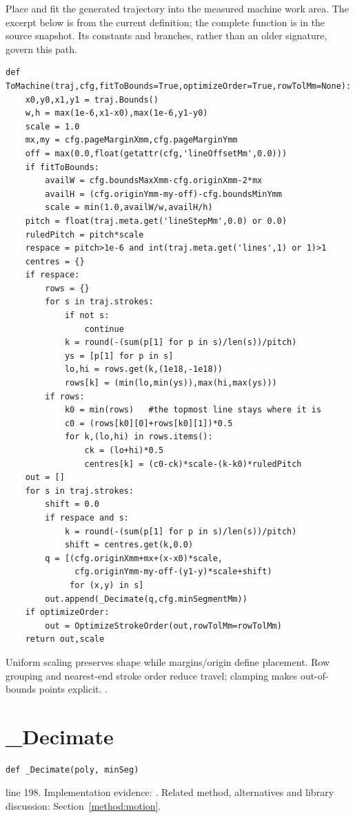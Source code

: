 Place and fit the generated trajectory into the measured machine work area. The excerpt below is from the current definition; the complete function is in the source snapshot. Its constants and branches, rather than an older signature, govern this path.


\begin{lstlisting}[style=plain]
def ToMachine(traj,cfg,fitToBounds=True,optimizeOrder=True,rowTolMm=None):
    x0,y0,x1,y1 = traj.Bounds()
    w,h = max(1e-6,x1-x0),max(1e-6,y1-y0)
    scale = 1.0
    mx,my = cfg.pageMarginXmm,cfg.pageMarginYmm
    off = max(0.0,float(getattr(cfg,'lineOffsetMm',0.0)))
    if fitToBounds:
        availW = cfg.boundsMaxXmm-cfg.originXmm-2*mx
        availH = (cfg.originYmm-my-off)-cfg.boundsMinYmm
        scale = min(1.0,availW/w,availH/h)
    pitch = float(traj.meta.get('lineStepMm',0.0) or 0.0)
    ruledPitch = pitch*scale
    respace = pitch>1e-6 and int(traj.meta.get('lines',1) or 1)>1
    centres = {}
    if respace:
        rows = {}
        for s in traj.strokes:
            if not s:
                continue
            k = round(-(sum(p[1] for p in s)/len(s))/pitch)
            ys = [p[1] for p in s]
            lo,hi = rows.get(k,(1e18,-1e18))
            rows[k] = (min(lo,min(ys)),max(hi,max(ys)))
        if rows:
            k0 = min(rows)   #the topmost line stays where it is
            c0 = (rows[k0][0]+rows[k0][1])*0.5
            for k,(lo,hi) in rows.items():
                ck = (lo+hi)*0.5
                centres[k] = (c0-ck)*scale-(k-k0)*ruledPitch
    out = []
    for s in traj.strokes:
        shift = 0.0
        if respace and s:
            k = round(-(sum(p[1] for p in s)/len(s))/pitch)
            shift = centres.get(k,0.0)
        q = [(cfg.originXmm+mx+(x-x0)*scale,
              cfg.originYmm-my-off-(y1-y)*scale+shift)
             for (x,y) in s]
        out.append(_Decimate(q,cfg.minSegmentMm))
    if optimizeOrder:
        out = OptimizeStrokeOrder(out,rowTolMm=rowTolMm)
    return out,scale
\end{lstlisting}
Uniform scaling preserves shape while margins/origin define placement. Row grouping and nearest-end stroke order reduce travel; clamping makes out-of-bounds points explicit. \cite{bresenham1965,code2026}.


\section{\_Decimate}\label{fn:reproduce:-Decimate}
\begin{lstlisting}[style=sig]
def _Decimate(poly, minSeg)
\end{lstlisting}
 line 198. Implementation evidence: \cite{code2026}. Related method, alternatives and library discussion: Section~\ref{method:motion}.


